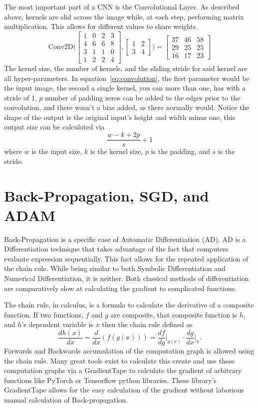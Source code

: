 The most important part of a CNN is the Convolutional Layer. As described above, kernels are slid across the image while, at each step, performing matrix multiplication. This allows for different values to share weights. \begin{equation}\label{eq:convolution}
	\text{Conv2D}\Bigg(\begin{bmatrix}
		1 & 0 & 2 & 3 \\
		4 & 6 & 6 & 8 \\
		3 & 1 & 1 & 0 \\
		1 & 2 & 2 & 4 
	\end{bmatrix}, \begin{bmatrix}
	1 & 2 \\ 3 & 4
\end{bmatrix}\Bigg)=\begin{bmatrix}
	37 & 46 & 58 \\
	29 & 25 & 25 \\
	16 & 17 & 23
\end{bmatrix}
\end{equation}
The kernel size, the number of kernels, and the sliding stride for said kernel are all hyper-parameters. In equation~\ref{eq:convolution}, the first parameter would be the input image, the second a single kernel, you can more than one, has with a stride of 1, $p$ number of padding zeros can be added to the edges prior to the convolution, and there wasn't a bias added, as there normally would. Notice the shape of the output is the original input's height and width minus one, this output size can be calculated via $$\frac{w-k+2p}{s}+1$$ where $w$ is the input size, $k$ is the kernel size, $p$ is the padding, and $s$ is the stride.

\section{Back-Propagation, SGD, and ADAM}

Back-Propagation is a specific case of Automatic Differentiation (AD). AD is a Differentiation technique that takes advantage of the fact that computers evaluate expression sequentially. This fact allows for the repeated application of the chain rule. While being similar to both Symbolic Differentiation and Numerical Differentiation, it is neither. Both classical methods of differentiation are comparatively slow at calculating the gradient to complicated functions. 

The chain rule, in calculus, is a formula to calculate the derivative of a composite function. If two functions, $f$ and $g$ are composite, that composite function is $h$, and $h$'s dependent variable is $x$ then the chain rule defined as 
$$\frac{dh(x)}{dx}=\frac{d}{dx}(f(g(x)))=\frac{df}{dg}\bigg|_{g(x)}\cdot\frac{dg}{dx}\bigg|_{x}.$$ Forwards and Backwards accumulation of the computation graph is allowed using the chain rule. Many great tools exist to calculate this create and use these computation graphs via a GradientTape to calculate the gradient of arbitrary functions like PyTorch or Tensorflow python libraries. These library's GradientTape allows for the easy calculation of the gradient without laborious manual calculation of Back-propagation.

